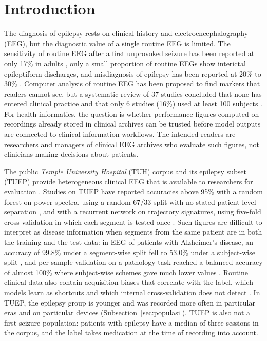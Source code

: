 \section{Introduction}\label{sec:intro}

The diagnosis of epilepsy rests on clinical history and electroencephalography (EEG), but the diagnostic value of a single routine EEG is limited.
The sensitivity of routine EEG after a first unprovoked seizure has been reported at only 17\% in adults \cite{lemoine2024}, only a small proportion of routine EEGs show interictal epileptiform discharges, and misdiagnosis of epilepsy has been reported at 20\% to 30\% \cite{myers2025}.
Computer analysis of routine EEG has been proposed to find markers that readers cannot see, but a systematic review of 37 studies concluded that none has entered clinical practice and that only 6 studies (16\%) used at least 100 subjects \cite{lemoine2024}.
For health informatics, the question is whether performance figures computed on recordings already stored in clinical archives can be trusted before model outputs are connected to clinical information workflows.
The intended readers are researchers and managers of clinical EEG archives who evaluate such figures, not clinicians making decisions about patients.

The public \textit{Temple University Hospital} (TUH) corpus and its epilepsy subset (TUEP) provide heterogeneous clinical EEG that is available to researchers for evaluation \cite{obeid2016,veloso2017}.
Studies on TUEP have reported accuracies above 95\% with a random forest on power spectra, using a random 67/33 split with no stated patient-level separation \cite{rohira2023}, and with a recurrent network on trajectory signatures, using five-fold cross-validation in which each segment is tested once \cite{tang2024}.
Such figures are difficult to interpret as disease information when segments from the same patient are in both the training and the test data: in EEG of patients with Alzheimer's disease, an accuracy of 99.8\% under a segment-wise split fell to 53.0\% under a subject-wise split \cite{brookshire2024}, and per-sample validation on a pathology task reached a balanced accuracy of almost 100\% where subject-wise schemes gave much lower values \cite{delpup2025}.
Routine clinical data also contain acquisition biases that correlate with the label, which models learn as shortcuts and which internal cross-validation does not detect \cite{ongly2024}. In TUEP, the epilepsy group is younger and was recorded more often in particular eras and on particular devices (Subsection~\ref{sec:populasi}). TUEP is also not a first-seizure population: patients with epilepsy have a median of three sessions in the corpus, and the label takes medication at the time of recording into account.

